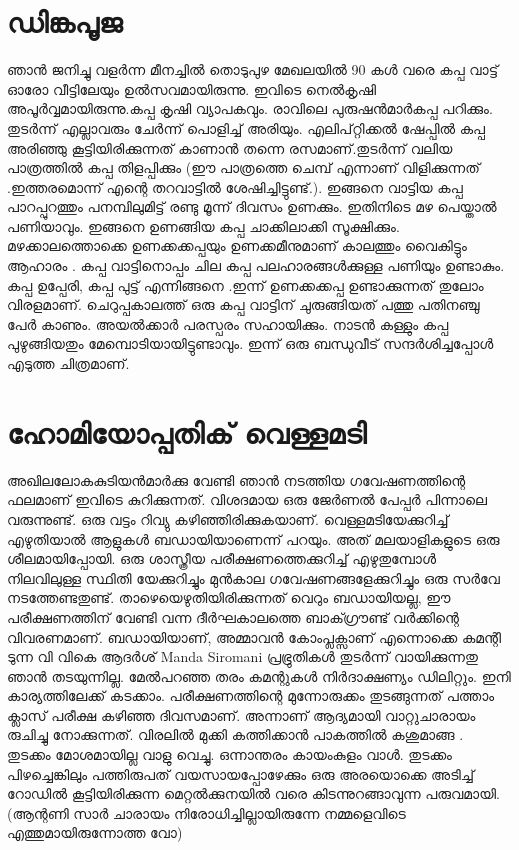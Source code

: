 \documentclass[10pt,a4paper]{report}
\begin{document}
 \section{ ഡിങ്കപൂജ}
 
 ഞാൻ ജനിച്ചു വളർന്ന മീനച്ചിൽ തൊടുപുഴ മേഖലയിൽ 90 കൾ വരെ കപ്പ വാട്ട് ഓരോ വീട്ടിലേയും ഉൽസവമായിരുന്നു. ഇവിടെ നെൽകൃഷി അപൂർവ്വമായിരുന്നു.കപ്പ കൃഷി വ്യാപകവും. രാവിലെ പുരുഷൻമാർകപ്പ പറിക്കും. തുടർന്ന് എല്ലാവരും ചേർന്ന് പൊളിച്ച് അരിയും. എലിപ്റ്റിക്കൽ ഷേപ്പിൽ കപ്പ അരിഞ്ഞു കൂട്ടിയിരിക്കുന്നത് കാണാൻ തന്നെ രസമാണ്.തുടർന്ന് വലിയ പാത്രത്തിൽ കപ്പ തിളപ്പിക്കും (ഈ പാത്രത്തെ ചെമ്പ് എന്നാണ് വിളിക്കുന്നത് .ഇത്തരമൊന്ന് എന്റെ തറവാട്ടിൽ ശേഷിച്ചിട്ടുണ്ട്.). ഇങ്ങനെ വാട്ടിയ കപ്പ പാറപ്പുറത്തും പനമ്പിലുമിട്ട് രണ്ടു മൂന്ന് ദിവസം ഉണക്കും. ഇതിനിടെ മഴ പെയ്താൽ പണിയാവും. ഇങ്ങനെ ഉണങ്ങിയ കപ്പ ചാക്കിലാക്കി സൂക്ഷിക്കും. മഴക്കാലത്തൊക്കെ ഉണക്കക്കപ്പയും ഉണക്കമീനുമാണ് കാലത്തും വൈകിട്ടും ആഹാരം . കപ്പ വാട്ടിനൊപ്പം ചില കപ്പ പലഹാരങ്ങൾക്കുള്ള പണിയും ഉണ്ടാകും. കപ്പ ഉപ്പേരി, കപ്പ പുട്ട് എന്നിങ്ങനെ .ഇന്ന് ഉണക്കക്കപ്പ ഉണ്ടാക്കുന്നത് തുലോം വിരളമാണ്. ചെറുപ്പകാലത്ത് ഒരു കപ്പ വാട്ടിന് ചുരുങ്ങിയത് പത്തു പതിനഞ്ചു പേർ കാണും. അയൽക്കാർ പരസ്പരം സഹായിക്കും. നാടൻ കള്ളും കപ്പ പുഴുങ്ങിയതും മേമ്പൊടിയായിട്ടുണ്ടാവും. ഇന്ന് ഒരു ബന്ധുവീട് സന്ദർശിച്ചപ്പോൾ എടുത്ത ചിത്രമാണ്.
\section{
 ഹോമിയോപ്പതിക് വെള്ളമടി}
 
 അഖിലലോകകുടിയൻമാർക്കു വേണ്ടി ഞാൻ നടത്തിയ ഗവേഷണത്തിന്റെ ഫലമാണ് ഇവിടെ കുറിക്കുന്നത്. വിശദമായ ഒരു ജേർണൽ പേപ്പർ പിന്നാലെ വരുന്നുണ്ട്. ഒരു വട്ടം റിവ്യു കഴിഞ്ഞിരിക്കുകയാണ്. വെള്ളമടിയേക്കുറിച്ച് എഴുതിയാൽ ആളുകൾ ബഡായിയാണെന്ന് പറയും. അത് മലയാളികളുടെ ഒരു ശീലമായിപ്പോയി. ഒരു ശാസ്ത്രീയ പരീക്ഷണത്തെക്കുറിച്ച് എഴുതുമ്പോൾ നിലവിലുള്ള സ്ഥിതി യേക്കുറിച്ചും മുൻകാല ഗവേഷണങ്ങളേക്കുറിച്ചും ഒരു സർവേ നടത്തേണ്ടതുണ്ട്. താഴെയെഴുതിയിരിക്കുന്നത് വെറും ബഡായിയല്ല, ഈ പരീക്ഷണത്തിന് വേണ്ടി വന്ന ദീർഘകാലത്തെ ബാക്ഗ്രൗണ്ട് വർക്കിന്റെ വിവരണമാണ്. ബഡായിയാണ്, അമ്മാവൻ കോംപ്ലക്സാണ് എന്നൊക്കെ കമന്റി ടുന്ന വി വികെ ആദർശ് Manda Siromani പ്രഭ്രുതികൾ തുടർന്ന് വായിക്കുന്നതു ഞാൻ തടയുന്നില്ല. മേൽപറഞ്ഞ തരം കമന്റുകൾ നിർദാക്ഷണ്യം ഡിലിറ്റും. ഇനി കാര്യത്തിലേക്ക് കടക്കാം. പരീക്ഷണത്തിന്റെ മുന്നോരുക്കം തുടങ്ങുന്നത് പത്താം ക്ലാസ് പരീക്ഷ കഴിഞ്ഞ ദിവസമാണ്. അന്നാണ് ആദ്യമായി വാറ്റുചാരായം രുചിച്ചു നോക്കുന്നത്. വിരലിൽ മുക്കി കത്തിക്കാൻ പാകത്തിൽ കശുമാങ്ങ . തുടക്കം മോശമായില്ല വാളു വെച്ചു. ഒന്നാന്തരം കായംകുളം വാൾ. തുടക്കം പിഴച്ചെങ്കിലും പത്തിരുപത് വയസായപ്പോഴേക്കും ഒരു അരയൊക്കെ അടിച്ച് റോഡിൽ കൂട്ടിയിരിക്കുന്ന മെറ്റൽക്കുനയിൽ വരെ കിടന്നുറങ്ങാവുന്ന പരുവമായി.(ആന്റണി സാർ ചാരായം നിരോധിച്ചില്ലായിരുന്നേ നമ്മളെവിടെ എത്തുമായിരുന്നോത്ത വോ)
 
\end{document}
